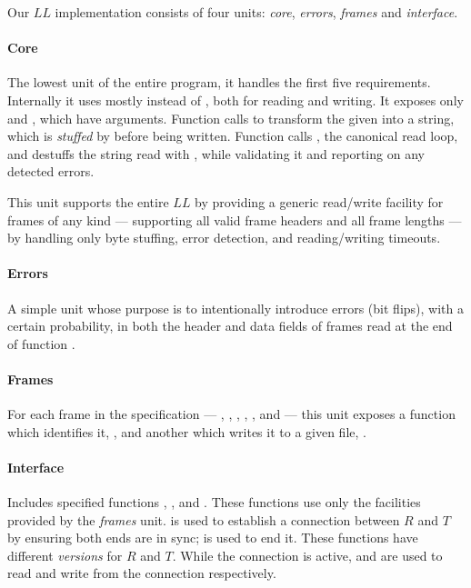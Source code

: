 \documentclass[main.tex]{subfiles}
\begin{document}
Our $LL$ implementation consists of four units: \emph{core}, \emph{errors}, \emph{frames} and \emph{interface}.

\paragraph{Core}
The lowest unit of the entire program, it handles the first five requirements.
Internally it uses mostly  instead of , both for reading and writing.
It exposes only  and , which have  arguments.
Function  calls  to transform the given  into a string, which is \textit{stuffed} by  before being written.
Function  calls , the canonical read loop, and destuffs the string read with , while validating it and reporting on any detected errors.

This unit supports the entire $LL$ by providing a generic read/write facility for frames of any kind --- supporting all valid frame headers and all frame lengths --- by handling only byte stuffing, error detection, and reading/writing timeouts.

\paragraph{Errors}
A simple unit whose purpose is to intentionally introduce errors (bit flips), with a certain probability, in both the header and data fields of frames read at the end of function .

\paragraph{Frames}
For each frame in the specification --- \fI{}, \fSET{}, \fDISC{}, \fUA{}, \fRR{}, and \fREJ{} --- this unit exposes a function which identifies it, , and another which writes it to a given file, .

\paragraph{Interface}
Includes specified functions , ,  and .
These functions use only the facilities provided by the \emph{frames} unit.
 is used to establish a connection between $R$ and $T$ by ensuring both ends are in sync;  is used to end it.
These functions have different \textit{versions} for $R$ and $T$.
While the connection is active,  and  are used to read and write from the connection respectively.
\end{document}
